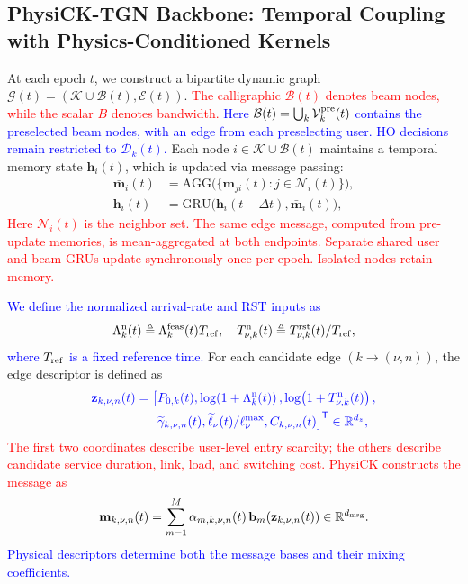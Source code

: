 \documentclass[10pt,letterpaper,journal]{IEEEtran}
\newcommand{\revnew}[1]{\textcolor{red}{#1}}
\begin{document}
\vspace{-4mm}
\subsection{PhysiCK-TGN Backbone: Temporal Coupling with Physics-Conditioned Kernels}
\label{subsec:physick_main}

At each epoch $t$, we construct a bipartite dynamic graph
$\mathcal{G}(t)=(\mathcal{K}\cup\mathcal{B}(t),\mathcal{E}(t))$.
\revnew{The calligraphic $\mathcal B(t)$ denotes beam nodes, while the scalar $B$ denotes bandwidth.}
\textcolor{blue}{Here $\mathcal B(t)=\bigcup_k\mathcal V_k^{\rm pre}(t)$ contains the preselected beam nodes, with an edge from each preselecting user. HO decisions remain restricted to $\mathcal D_k(t)$.}
Each node $i\in\mathcal{K}\cup\mathcal{B}(t)$ maintains a temporal memory state $\mathbf{h}_i(t)$, which is updated via message passing:
\begin{align}
\bar{\mathbf{m}}_i(t) &=
\mathrm{AGG}\Big(\{\mathbf{m}_{ji}(t): j\in \mathcal{N}_i(t)\}\Big),
\label{eq:agg_main}\\
\mathbf{h}_i(t) &= \mathrm{GRU}\big(\mathbf{h}_i(t-\Delta t),\bar{\mathbf{m}}_i(t)\big),
\label{eq:gru_main}
\end{align}
\revnew{Here $\mathcal N_i(t)$ is the neighbor set. The same edge message, computed from pre-update memories, is mean-aggregated at both endpoints. Separate shared user and beam GRUs update synchronously once per epoch. Isolated nodes retain memory.}

\textcolor{blue}{We define the normalized arrival-rate and RST inputs as
\begin{equation}
\begin{aligned}
\Lambda_k^{\mathrm n}(t)
\triangleq \Lambda_k^{\rm feas}(t)T_{\rm ref}, \quad T_{\nu,k}^{\mathrm n}(t)
\triangleq T_{\nu,k}^{\rm rst}(t)/T_{\rm ref},
\end{aligned}   
\label{eq:normalized}
\end{equation}
where $T_{\rm ref}$ is a fixed reference time.}
For each candidate edge $(k\!\to\!(\nu,n))$, the edge descriptor is defined as
\begin{equation}
\textcolor{blue}{\begin{aligned}
\mathbf z_{k,\nu,n}(t)
=\big[&
P_{0,k}(t),
\log\!\left(1+\Lambda_k^{\rm n}(t)\right),
\log\!\left(1+{T_{\nu,k}^{\rm n}(t)}\right),\\
&\widetilde{\gamma}_{k,\nu,n}(t),
\widetilde{\ell}_{\nu}(t)/\ell_{\nu}^{\max},
 C_{k,\nu,n}(t)
\big]^{\mathsf T}
\in\mathbb R^{d_z},
\end{aligned}}
\label{eq:z_main}
\end{equation}
\revnew{The first two coordinates describe user-level entry scarcity; the others describe candidate service duration, link, load, and switching cost. PhysiCK constructs the message as}
\begin{equation}
\mathbf{m}_{k,\nu,n}(t)=\sum_{m=1}^{M}\alpha_{m,k,\nu,n}(t)\,\mathbf{b}_m(\mathbf{z}_{k,\nu,n}(t))\in\mathbb{R}^{d_{\rm msg}}.
\label{eq:msg_kernel_main}
\end{equation}
\textcolor{blue}{Physical descriptors determine both the message bases and their mixing coefficients.}
\end{document}
